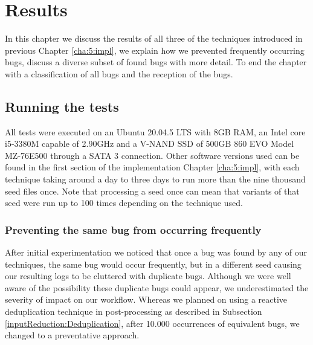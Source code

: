 \chapter{Results}
\label{cha:6:res}
\label{res:Intro}
In this chapter we discuss the results of all three of the techniques introduced in previous Chapter \ref{cha:5:impl}, we explain how we prevented frequently occurring bugs, discuss a diverse subset of found bugs with more detail. To end the chapter with a classification of all bugs and the reception of the bugs.


\section{Running the tests}
\label{res:RunningTests}
\label{res:Specs}
All tests were executed on an Ubuntu 20.04.5 LTS with 8GB RAM, an Intel core i5-3380M capable of 2.90GHz and a V-NAND SSD of 500GB 860 EVO Model MZ-76E500 through a SATA 3 connection. Other software versions used can be found in the first section of the implementation Chapter \ref{cha:5:impl}, with each technique taking around a day to three days to run more than the nine thousand seed files once. Note that processing a seed once can mean that variants of that seed were run up to 100 times depending on the technique used.


\subsection{Preventing the same bug from occurring frequently}
After initial experimentation we noticed that once a bug was found by any of our techniques, the same bug would occur frequently, but in a different seed causing our resulting logs to be cluttered with duplicate bugs. Although we were well aware of the possibility these duplicate bugs could appear, we underestimated the severity of impact on our workflow. Whereas we planned on using a reactive deduplication technique in post-processing as described in Subsection \ref{inputReduction:Deduplication}, after 10.000 occurrences of equivalent bugs, we changed to a preventative approach. 

